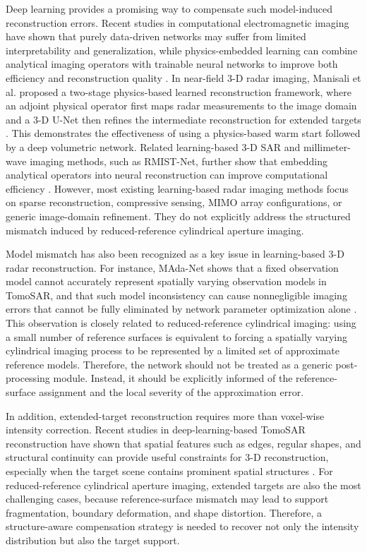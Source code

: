 \documentclass[journal]{IEEEtran}
\begin{document}
Deep learning provides a promising way to compensate such model-induced reconstruction errors. Recent studies in computational electromagnetic imaging have shown that purely data-driven networks may suffer from limited interpretability and generalization, while physics-embedded learning can combine analytical imaging operators with trainable neural networks to improve both efficiency and reconstruction quality \cite{Guo_Huang_Li_Zhang_Eldar_2023}. In near-field 3-D radar imaging, Manisali et al. proposed a two-stage physics-based learned reconstruction framework, where an adjoint physical operator first maps radar measurements to the image domain and a 3-D U-Net then refines the intermediate reconstruction for extended targets \cite{Manisali_Oral_Oktem_2024}. This demonstrates the effectiveness of using a physics-based warm start followed by a deep volumetric network. Related learning-based 3-D SAR and millimeter-wave imaging methods, such as RMIST-Net, further show that embedding analytical operators into neural reconstruction can improve computational efficiency \cite{Wang_Wei_Liang_Zeng_Wang_Shi_Zhang_2022}. However, most existing learning-based radar imaging methods focus on sparse reconstruction, compressive sensing, MIMO array configurations, or generic image-domain refinement. They do not explicitly address the structured mismatch induced by reduced-reference cylindrical aperture imaging.

Model mismatch has also been recognized as a key issue in learning-based 3-D radar reconstruction. For instance, MAda-Net shows that a fixed observation model cannot accurately represent spatially varying observation models in TomoSAR, and that such model inconsistency can cause nonnegligible imaging errors that cannot be fully eliminated by network parameter optimization alone \cite{Wang_Liu_Zhu_Liu_Ding_Zeng_2023}. This observation is closely related to reduced-reference cylindrical imaging: using a small number of reference surfaces is equivalent to forcing a spatially varying cylindrical imaging process to be represented by a limited set of approximate reference models. Therefore, the network should not be treated as a generic post-processing module. Instead, it should be explicitly informed of the reference-surface assignment and the local severity of the approximation error.

In addition, extended-target reconstruction requires more than voxel-wise intensity correction. Recent studies in deep-learning-based TomoSAR reconstruction have shown that spatial features such as edges, regular shapes, and structural continuity can provide useful constraints for 3-D reconstruction, especially when the target scene contains prominent spatial structures \cite{Zeng_Zhan_Ren_Ma_Liu_Shi_Wei_Wang_Zhang_2025}. For reduced-reference cylindrical aperture imaging, extended targets are also the most challenging cases, because reference-surface mismatch may lead to support fragmentation, boundary deformation, and shape distortion. Therefore, a structure-aware compensation strategy is needed to recover not only the intensity distribution but also the target support.
\end{document}
